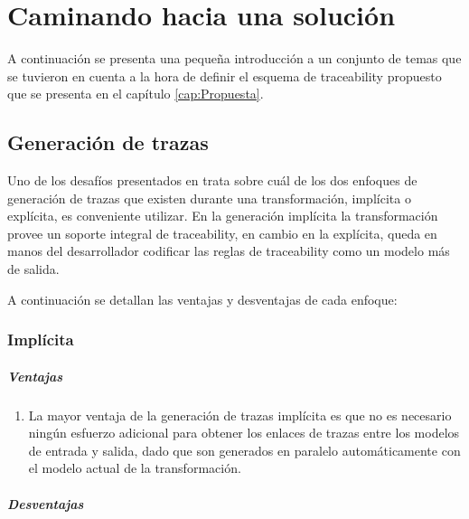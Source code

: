 \documentclass[a4paper,12pt,oneside]{book}
\begin{document}
\chapter{Caminando hacia una solución}

A continuación se presenta una pequeña introducción a un conjunto de temas que se tuvieron en cuenta a la hora de definir el esquema de traceability propuesto que se presenta en el capítulo \ref{cap:Propuesta}.

\section{Generación de trazas}

Uno de los desafíos presentados en \cite{GrammelVoigt} trata sobre cuál de los dos enfoques de generación de trazas que existen durante una transformación, implícita o explícita, es conveniente utilizar. En la generación implícita la transformación provee un soporte integral de traceability, en cambio en la explícita, queda en manos del desarrollador codificar las reglas de traceability como un modelo más de salida.

A continuación se detallan las ventajas y desventajas de cada enfoque:

\subsection{Implícita}

\paragraph{Ventajas}

\begin{enumerate}

\item	La mayor ventaja de la generación de trazas implícita es que no es necesario ningún esfuerzo adicional para obtener los enlaces de trazas entre los modelos de entrada y salida, dado que son generados en paralelo automáticamente con el modelo actual de la transformación.

\end{enumerate}

\paragraph{Desventajas}
\end{document}
